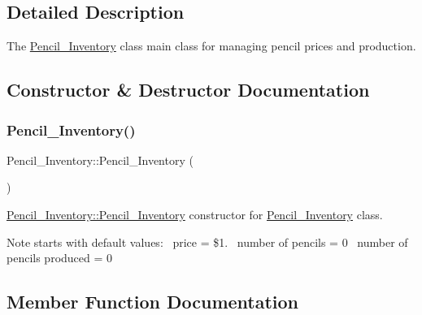 \subsection{Detailed Description}
The \mbox{\hyperlink{classPencil__Inventory}{Pencil\+\_\+\+Inventory}} class main class for managing pencil prices and production. 

\subsection{Constructor \& Destructor Documentation}
\mbox{\label{classPencil__Inventory_a68480c5a7aa85cee3cb19619115ad552}} 
\subsubsection{\texorpdfstring{Pencil\_Inventory()}{Pencil\_Inventory()}}
{\footnotesize\ttfamily Pencil\+\_\+\+Inventory\+::\+Pencil\+\_\+\+Inventory (\begin{DoxyParamCaption}{ }\end{DoxyParamCaption})}



\mbox{\hyperlink{classPencil__Inventory_a68480c5a7aa85cee3cb19619115ad552}{Pencil\+\_\+\+Inventory\+::\+Pencil\+\_\+\+Inventory}} constructor for \mbox{\hyperlink{classPencil__Inventory}{Pencil\+\_\+\+Inventory}} class. 

\begin{DoxyNote}{Note}
starts with default values\+:~\newline
 price = \$1.~\newline
 number of pencils = 0~\newline
 number of pencils produced = 0~\newline

\end{DoxyNote}


\subsection{Member Function Documentation}
\mbox{\label{classPencil__Inventory_a5c8d580bd32a2ef4b2196da7570203bf}} 
